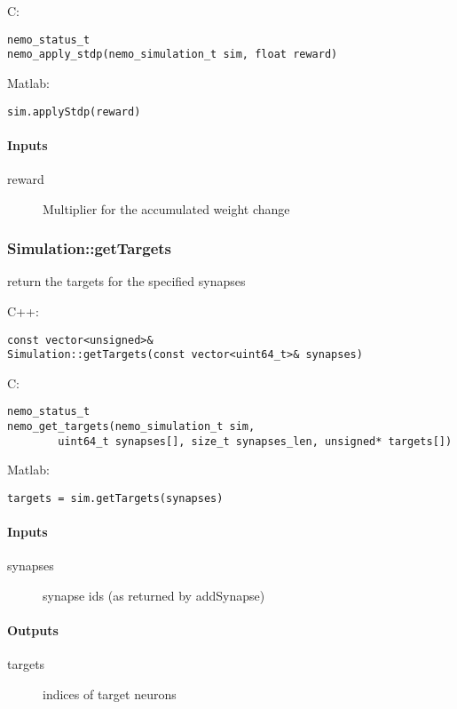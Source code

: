 \noindent C:
\begin{lstlisting}[aboveskip=2pt]
nemo_status_t
nemo_apply_stdp(nemo_simulation_t sim, float reward)
\end{lstlisting}

\noindent Matlab:
\begin{lstlisting}[aboveskip=2pt]
sim.applyStdp(reward)
\end{lstlisting}
\paragraph{Inputs}
\begin{description}
\item[reward] Multiplier for the accumulated weight change
\end{description}

\clearpage
\subsubsection*{Simulation::getTargets}
\label{fn: getTargets}
return the targets for the specified synapses


\noindent C++:
\begin{lstlisting}[aboveskip=2pt]
const vector<unsigned>&
Simulation::getTargets(const vector<uint64_t>& synapses)
\end{lstlisting}

\noindent C:
\begin{lstlisting}[aboveskip=2pt]
nemo_status_t
nemo_get_targets(nemo_simulation_t sim, 
        uint64_t synapses[], size_t synapses_len, unsigned* targets[])
\end{lstlisting}

\noindent Matlab:
\begin{lstlisting}[aboveskip=2pt]
targets = sim.getTargets(synapses)
\end{lstlisting}
\paragraph{Inputs}
\begin{description}
\item[synapses] synapse ids (as returned by addSynapse)
\end{description}
\paragraph{Outputs}
\begin{description}
\item[targets] indices of target neurons
\end{description}

